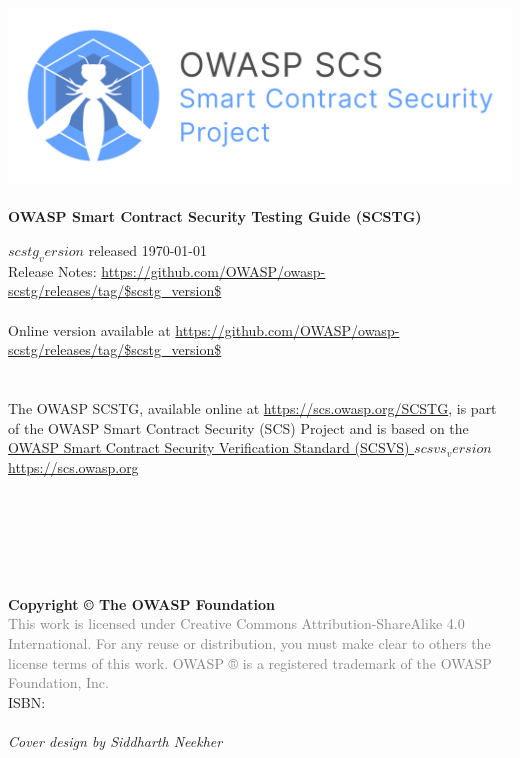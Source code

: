 \thispagestyle{empty} %

\includegraphics[width=\textwidth]{Document/Images/owasp_scs_header.png} \\ \\

\large{\textbf{OWASP Smart Contract Security Testing Guide (SCSTG)} }

$scstg_version$ released \today \\

Release Notes: \url{https://github.com/OWASP/owasp-scstg/releases/tag/$scstg_version$} \\ \\

Online version available at \url{https://github.com/OWASP/owasp-scstg/releases/tag/$scstg_version$} \\ \\ \\


The OWASP SCSTG, available online at \url{https://scs.owasp.org/SCSTG}, is part of the OWASP Smart Contract Security (SCS) Project and is based on the \href{https://scs.owasp.org/SCSVS}{OWASP Smart Contract Security Verification Standard (SCSVS) $scsvs_version$} \\

\url{https://scs.owasp.org} \\ \\ \\ \\ \\ \\ \\

\textbf{Copyright © The OWASP Foundation} \\

\footnotesize{\textcolor{gray}{This work is licensed under Creative Commons Attribution-ShareAlike 4.0 International. For any reuse or distribution, you must make clear to others the license terms of this work.
OWASP ® is a registered trademark of the OWASP Foundation, Inc.} }\\

ISBN: \\ \\

\emph{Cover design by Siddharth Neekher}